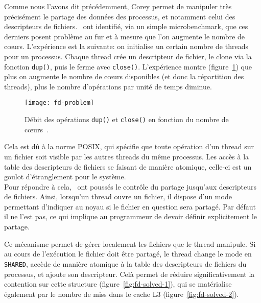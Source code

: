       Comme nous l'avons dit précédemment, Corey permet de manipuler très
      précisément le partage des données des processus, et notamment celui des
      descripteurs de fichiers.~\citeauthor{boyd2008corey} ont identifié, via un
      simple microbenchmark, que ces derniers posent problème au fur et à mesure
      que l'on augmente le nombre de c\oe urs. L'expérience est la suivante: on
      initialise un certain nombre de threads pour un processus. Chaque thread
      crée un descripteur de fichier, le clone via la fonction \texttt{dup()},
      puis le ferme avec \texttt{close()}. L'expérience montre
      (figure~\ref{fig:fd-problem}) que plus on augmente le nombre de c\oe urs
      disponibles (et donc la répartition des threads), plus le nombre
      d'opérations par unité de temps diminue.

      \begin{figure}[ht]
        \centering
        \texttt{[image: fd-problem]}
        \caption{Débit des opérations \texttt{dup()} et \texttt{close()} en
          fonction du nombre de c\oe urs~\citep{boyd2008corey}.}
        \label{fig:fd-problem}
      \end{figure}

      Cela est dû à la norme POSIX, qui spécifie que toute opération d'un thread
      sur un fichier soit visible par les autres threads du même processus. Les
      accès à la table des descripteurs de fichiers se faisant de manière
      atomique, celle-ci est un goulot d'étranglement pour le système.\\

      Pour répondre à cela,~\citeauthor{boyd2008corey} ont poussés le contrôle
      du partage jusqu'aux descripteurs de fichiers. Ainsi, lorsqu'un thread
      ouvre un fichier, il dispose d'un mode permettant d'indiquer au noyau si
      le fichier en question sera partagé. Par défaut il ne l'est pas, ce qui
      implique au programmeur de devoir définir explicitement le partage.

      Ce mécanisme permet de gérer localement les fichiers que le thread
      manipule. Si au cours de l'exécution le fichier doit être partagé, le
      thread change le mode en \texttt{SHARED}, accède de manière atomique à la
      table des descripteurs de fichiers du processus, et ajoute son
      descripteur. Celà permet de réduire significativement la contention sur
      cette structure (figure~\ref{fig:fd-solved-1}), qui se matérialise
      également par le nombre de miss dans le cache L3
      (figure~\ref{fig:fd-solved-2}).

